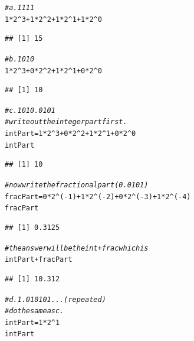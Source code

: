 \documentclass{article}\usepackage[]{graphicx}\usepackage[]{xcolor}
\makeatletter
\newcommand{\hlnum}[1]{\textcolor[rgb]{0.686,0.059,0.569}{#1}}%
\newcommand{\hlcom}[1]{\textcolor[rgb]{0.678,0.584,0.686}{\textit{#1}}}%
\newcommand{\hlopt}[1]{\textcolor[rgb]{0,0,0}{#1}}%
\newcommand{\hlstd}[1]{\textcolor[rgb]{0.345,0.345,0.345}{#1}}%
\newcommand{\hlkwb}[1]{\textcolor[rgb]{0.69,0.353,0.396}{#1}}%
\newenvironment{kframe}{%
 \def\at@end@of@kframe{}%
 \ifinner\ifhmode%
  \def\at@end@of@kframe{\end{minipage}}%
  \begin{minipage}{\columnwidth}%
 \fi\fi%
 \def\FrameCommand##1{\hskip\@totalleftmargin \hskip-\fboxsep
 \colorbox{shadecolor}{##1}\hskip-\fboxsep
     \hskip-\linewidth \hskip-\@totalleftmargin \hskip\columnwidth}%
 \MakeFramed {\advance\hsize-\width
   \@totalleftmargin\z@ \linewidth\hsize
   \@setminipage}}%
 {\par\unskip\endMakeFramed%
 \at@end@of@kframe}
\newenvironment{knitrout}{}{} %
\makeatother
\begin{document}
\begin{knitrout}
\begin{kframe}
\begin{alltt}
\hlcom{# a. 1111}
\hlnum{1}\hlopt{*}\hlnum{2}\hlopt{^}\hlnum{3} \hlopt{+} \hlnum{1}\hlopt{*}\hlnum{2}\hlopt{^}\hlnum{2} \hlopt{+} \hlnum{1}\hlopt{*}\hlnum{2}\hlopt{^}\hlnum{1} \hlopt{+} \hlnum{1}\hlopt{*}\hlnum{2}\hlopt{^}\hlnum{0}
\end{alltt}
\begin{verbatim}
## [1] 15
\end{verbatim}
\begin{alltt}
\hlcom{# b. 1010}
\hlnum{1}\hlopt{*}\hlnum{2}\hlopt{^}\hlnum{3} \hlopt{+} \hlnum{0}\hlopt{*}\hlnum{2}\hlopt{^}\hlnum{2} \hlopt{+} \hlnum{1}\hlopt{*}\hlnum{2}\hlopt{^}\hlnum{1} \hlopt{+} \hlnum{0}\hlopt{*}\hlnum{2}\hlopt{^}\hlnum{0}
\end{alltt}
\begin{verbatim}
## [1] 10
\end{verbatim}
\begin{alltt}
\hlcom{# c. 1010.0101}
\hlcom{# write out the integer part first.}
\hlstd{intPart} \hlkwb{=} \hlnum{1}\hlopt{*}\hlnum{2}\hlopt{^}\hlnum{3} \hlopt{+} \hlnum{0}\hlopt{*}\hlnum{2}\hlopt{^}\hlnum{2} \hlopt{+} \hlnum{1}\hlopt{*}\hlnum{2}\hlopt{^}\hlnum{1} \hlopt{+} \hlnum{0}\hlopt{*}\hlnum{2}\hlopt{^}\hlnum{0}
\hlstd{intPart}
\end{alltt}
\begin{verbatim}
## [1] 10
\end{verbatim}
\begin{alltt}
\hlcom{# now write the fractional part (0.0101)}
\hlstd{fracPart} \hlkwb{=} \hlnum{0}\hlopt{*}\hlnum{2}\hlopt{^}\hlstd{(}\hlopt{-}\hlnum{1}\hlstd{)} \hlopt{+} \hlnum{1}\hlopt{*}\hlnum{2}\hlopt{^}\hlstd{(}\hlopt{-}\hlnum{2}\hlstd{)} \hlopt{+} \hlnum{0}\hlopt{*}\hlnum{2}\hlopt{^}\hlstd{(}\hlopt{-}\hlnum{3}\hlstd{)} \hlopt{+} \hlnum{1}\hlopt{*}\hlnum{2}\hlopt{^}\hlstd{(}\hlopt{-}\hlnum{4}\hlstd{)}
\hlstd{fracPart}
\end{alltt}
\begin{verbatim}
## [1] 0.3125
\end{verbatim}
\begin{alltt}
\hlcom{# the answer will be the int + frac which is}
\hlstd{intPart} \hlopt{+} \hlstd{fracPart}
\end{alltt}
\begin{verbatim}
## [1] 10.312
\end{verbatim}
\begin{alltt}
\hlcom{# d. 1.010101...(repeated)}
\hlcom{# do the same as c.}
\hlstd{intPart} \hlkwb{=} \hlnum{1}\hlopt{*}\hlnum{2}\hlopt{^}\hlnum{1}
\hlstd{intPart}
\end{alltt}

\end{kframe}
\end{knitrout}
\end{document}
